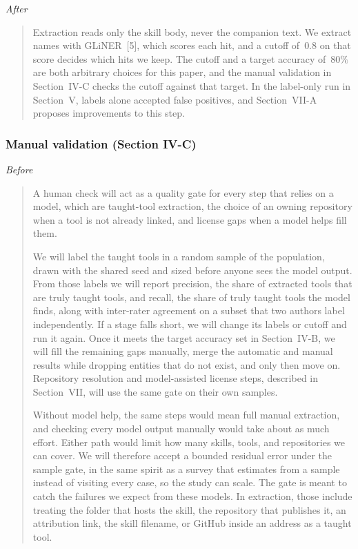 \noindent\textit{After}
\begin{quote}
Extraction reads only the skill body, never the companion text.
We extract names with GLiNER~[5], which scores each hit, and a cutoff of~$0.8$ on that score decides which hits we keep.
The cutoff and a target accuracy of~$80\%$ are both arbitrary choices for this paper, and the manual validation in Section~IV-C checks the cutoff against that target.
In the label-only run in Section~V, labels alone accepted false positives, and Section~VII-A proposes improvements to this step.
\end{quote}

\subsubsection*{Manual validation (Section IV-C)}

\textit{Before}
\begin{quote}
A human check will act as a quality gate for every step that relies on a model, which are taught-tool extraction, the choice of an owning repository when a tool is not already linked, and license gaps when a model helps fill them.

We will label the taught tools in a random sample of the population, drawn with the shared seed and sized before anyone sees the model output.
From those labels we will report precision, the share of extracted tools that are truly taught tools, and recall, the share of truly taught tools the model finds, along with inter-rater agreement on a subset that two authors label independently.
If a stage falls short, we will change its labels or cutoff and run it again.
Once it meets the target accuracy set in Section~IV-B, we will fill the remaining gaps manually, merge the automatic and manual results while dropping entities that do not exist, and only then move on.
Repository resolution and model-assisted license steps, described in Section~VII, will use the same gate on their own samples.

Without model help, the same steps would mean full manual extraction, and checking every model output manually would take about as much effort.
Either path would limit how many skills, tools, and repositories we can cover.
We will therefore accept a bounded residual error under the sample gate, in the same spirit as a survey that estimates from a sample instead of visiting every case, so the study can scale.
The gate is meant to catch the failures we expect from these models.
In extraction, those include treating the folder that hosts the skill, the repository that publishes it, an attribution link, the skill filename, or GitHub inside an address as a taught tool.
\end{quote}

